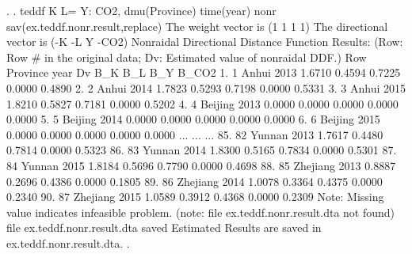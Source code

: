. 
. teddf K L= Y: CO2, dmu(Province) time(year) nonr sav(ex.teddf.nonr.result,replace)
{\smallskip}
 The weight vector is (1 1 1 1)
{\smallskip}
 The directional vector is (-K -L Y -CO2)
{\smallskip}
{\smallskip}
 Nonraidal Directional Distance Function Results:
    (Row: Row \# in the original data; Dv: Estimated value of nonraidal DDF.)
{\smallskip}
     {\TLC}
     {\VBAR} Row       Province   year       Dv      B_K      B_L      B_Y    B_CO2 {\VBAR}
     {\LFTT}
  1. {\VBAR}   1          Anhui   2013   1.6710   0.4594   0.7225   0.0000   0.4890 {\VBAR}
  2. {\VBAR}   2          Anhui   2014   1.7823   0.5293   0.7198   0.0000   0.5331 {\VBAR}
  3. {\VBAR}   3          Anhui   2015   1.8210   0.5827   0.7181   0.0000   0.5202 {\VBAR}
  4. {\VBAR}   4        Beijing   2013   0.0000   0.0000   0.0000   0.0000   0.0000 {\VBAR}
  5. {\VBAR}   5        Beijing   2014   0.0000   0.0000   0.0000   0.0000   0.0000 {\VBAR}
  6. {\VBAR}   6        Beijing   2015   0.0000   0.0000   0.0000   0.0000   0.0000 {\VBAR}
                                     ...
                                     ...
                                     ...
 85. {\VBAR}  82         Yunnan   2013   1.7617   0.4480   0.7814   0.0000   0.5323 {\VBAR}
 86. {\VBAR}  83         Yunnan   2014   1.8300   0.5165   0.7834   0.0000   0.5301 {\VBAR}
 87. {\VBAR}  84         Yunnan   2015   1.8184   0.5696   0.7790   0.0000   0.4698 {\VBAR}
 88. {\VBAR}  85       Zhejiang   2013   0.8887   0.2696   0.4386   0.0000   0.1805 {\VBAR}
 89. {\VBAR}  86       Zhejiang   2014   1.0078   0.3364   0.4375   0.0000   0.2340 {\VBAR}
 90. {\VBAR}  87       Zhejiang   2015   1.0589   0.3912   0.4368   0.0000   0.2309 {\VBAR}
     {\BLC}
Note: Missing value indicates infeasible problem.
(note: file ex.teddf.nonr.result.dta not found)
file ex.teddf.nonr.result.dta saved
{\smallskip}
Estimated Results are saved in ex.teddf.nonr.result.dta.
{\smallskip}
. 
